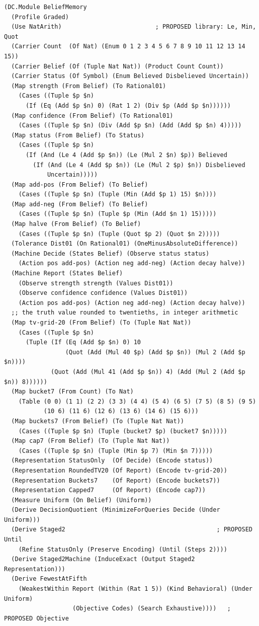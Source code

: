 \documentclass[11pt]{article}
\theoremstyle{definition}
\theoremstyle{plain}
\begin{document}
\begin{lstlisting}
(DC.Module BeliefMemory
  (Profile Graded)
  (Use NatArith)                          ; PROPOSED library: Le, Min, Quot
  (Carrier Count  (Of Nat) (Enum 0 1 2 3 4 5 6 7 8 9 10 11 12 13 14 15))
  (Carrier Belief (Of (Tuple Nat Nat)) (Product Count Count))
  (Carrier Status (Of Symbol) (Enum Believed Disbelieved Uncertain))
  (Map strength (From Belief) (To Rational01)
    (Cases ((Tuple $p $n)
      (If (Eq (Add $p $n) 0) (Rat 1 2) (Div $p (Add $p $n))))))
  (Map confidence (From Belief) (To Rational01)
    (Cases ((Tuple $p $n) (Div (Add $p $n) (Add (Add $p $n) 4)))))
  (Map status (From Belief) (To Status)
    (Cases ((Tuple $p $n)
      (If (And (Le 4 (Add $p $n)) (Le (Mul 2 $n) $p)) Believed
        (If (And (Le 4 (Add $p $n)) (Le (Mul 2 $p) $n)) Disbelieved
            Uncertain)))))
  (Map add-pos (From Belief) (To Belief)
    (Cases ((Tuple $p $n) (Tuple (Min (Add $p 1) 15) $n))))
  (Map add-neg (From Belief) (To Belief)
    (Cases ((Tuple $p $n) (Tuple $p (Min (Add $n 1) 15)))))
  (Map halve (From Belief) (To Belief)
    (Cases ((Tuple $p $n) (Tuple (Quot $p 2) (Quot $n 2)))))
  (Tolerance Dist01 (On Rational01) (OneMinusAbsoluteDifference))
  (Machine Decide (States Belief) (Observe status status)
    (Action pos add-pos) (Action neg add-neg) (Action decay halve))
  (Machine Report (States Belief)
    (Observe strength strength (Values Dist01))
    (Observe confidence confidence (Values Dist01))
    (Action pos add-pos) (Action neg add-neg) (Action decay halve))
  ;; the truth value rounded to twentieths, in integer arithmetic
  (Map tv-grid-20 (From Belief) (To (Tuple Nat Nat))
    (Cases ((Tuple $p $n)
      (Tuple (If (Eq (Add $p $n) 0) 10
                 (Quot (Add (Mul 40 $p) (Add $p $n)) (Mul 2 (Add $p $n))))
             (Quot (Add (Mul 41 (Add $p $n)) 4) (Add (Mul 2 (Add $p $n)) 8))))))
  (Map bucket7 (From Count) (To Nat)
    (Table (0 0) (1 1) (2 2) (3 3) (4 4) (5 4) (6 5) (7 5) (8 5) (9 5)
           (10 6) (11 6) (12 6) (13 6) (14 6) (15 6)))
  (Map buckets7 (From Belief) (To (Tuple Nat Nat))
    (Cases ((Tuple $p $n) (Tuple (bucket7 $p) (bucket7 $n)))))
  (Map cap7 (From Belief) (To (Tuple Nat Nat))
    (Cases ((Tuple $p $n) (Tuple (Min $p 7) (Min $n 7)))))
  (Representation StatusOnly  (Of Decide) (Encode status))
  (Representation RoundedTV20 (Of Report) (Encode tv-grid-20))
  (Representation Buckets7    (Of Report) (Encode buckets7))
  (Representation Capped7     (Of Report) (Encode cap7))
  (Measure Uniform (On Belief) (Uniform))
  (Derive DecisionQuotient (MinimizeForQueries Decide (Under Uniform)))
  (Derive Staged2                                          ; PROPOSED Until
    (Refine StatusOnly (Preserve Encoding) (Until (Steps 2))))
  (Derive Staged2Machine (InduceExact (Output Staged2 Representation)))
  (Derive FewestAtFifth
    (WeakestWithin Report (Within (Rat 1 5)) (Kind Behavioral) (Under Uniform)
                   (Objective Codes) (Search Exhaustive))))   ; PROPOSED Objective
\end{lstlisting}
\end{document}
